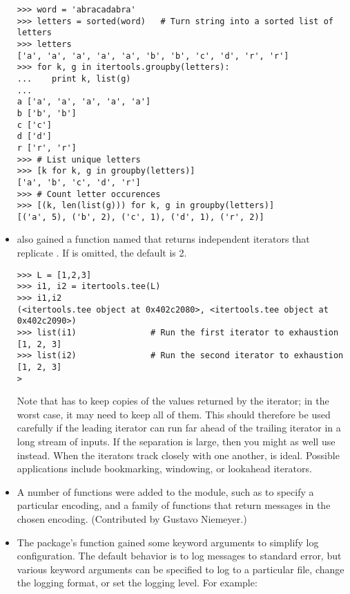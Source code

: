 \documentclass{howto}
\begin{document}
\begin{itemize}
\begin{verbatim}
>>> word = 'abracadabra'
>>> letters = sorted(word)   # Turn string into a sorted list of letters
>>> letters 
['a', 'a', 'a', 'a', 'a', 'b', 'b', 'c', 'd', 'r', 'r']
>>> for k, g in itertools.groupby(letters):
...    print k, list(g)
... 
a ['a', 'a', 'a', 'a', 'a']
b ['b', 'b']
c ['c']
d ['d']
r ['r', 'r']
>>> # List unique letters
>>> [k for k, g in groupby(letters)]                     
['a', 'b', 'c', 'd', 'r']
>>> # Count letter occurences
>>> [(k, len(list(g))) for k, g in groupby(letters)]     
[('a', 5), ('b', 2), ('c', 1), ('d', 1), ('r', 2)]
\end{verbatim}

\item {} also gained a function named
 that returns  independent
iterators that replicate .  If  is omitted, the
default is 2.

\begin{verbatim}
>>> L = [1,2,3]
>>> i1, i2 = itertools.tee(L)
>>> i1,i2
(<itertools.tee object at 0x402c2080>, <itertools.tee object at 0x402c2090>)
>>> list(i1)               # Run the first iterator to exhaustion
[1, 2, 3]
>>> list(i2)               # Run the second iterator to exhaustion
[1, 2, 3]
>\end{verbatim}

Note that  has to keep copies of the values returned 
by the iterator; in the worst case, it may need to keep all of them.  
This should therefore be used carefully if the leading iterator
can run far ahead of the trailing iterator in a long stream of inputs.
If the separation is large, then you might as well use 
 instead.  When the iterators track closely with one
another,  is ideal.  Possible applications include
bookmarking, windowing, or lookahead iterators.

\item  A number of functions were added to the  
module, such as  to specify a
particular encoding, and a family of  functions
that return messages in the chosen encoding.
(Contributed by Gustavo Niemeyer.)

\item The  package's  function 
gained some keyword arguments to simplify log configuration.  The
default behavior is to log messages to standard error, but
various keyword arguments can be specified to log to a particular file,
change the logging format, or set the logging level.  For example:


\end{itemize}
\end{document}
